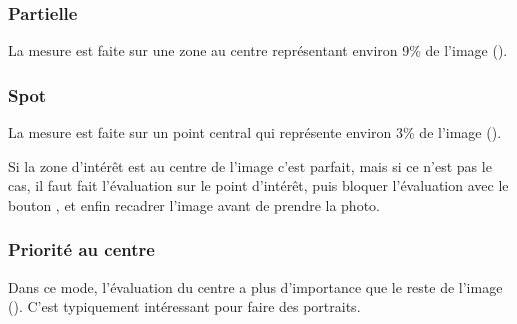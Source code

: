 \documentclass[a4paper,twoside]{article}
\begin{document}
% 

\subsubsection{Partielle}
La mesure est faite sur une zone au centre représentant environ 9\% de l'image ().


\subsubsection{Spot}
La mesure est faite sur un point central qui représente environ 3\% de l'image ().


\begin{remarque}
Si la zone d'intérêt est au centre de l'image c'est parfait, mais si ce n'est pas le cas, il faut fait l'évaluation sur le point d'intérêt, puis bloquer l'évaluation avec le bouton , et enfin recadrer l'image avant de prendre la photo.
\end{remarque}

\subsubsection{Priorité au centre}
Dans ce mode, l'évaluation du centre a plus d'importance que le reste de l'image (). C'est typiquement intéressant pour faire des portraits. 
\end{document}
